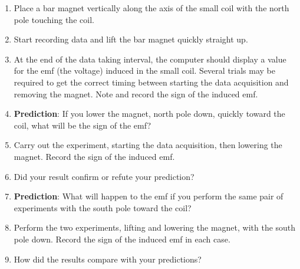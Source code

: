 \begin{enumerate}[resume*]


\item Place a bar magnet vertically along the axis of the small coil with
the north pole touching the coil.

\item Start recording data and lift the bar magnet quickly straight up.

\item At the end of the data taking interval, the computer should display
a value for the emf (the voltage) induced in the small coil.
Several trials may be required to get the correct timing between starting
the data acquisition and removing the magnet. Note and record the sign of the 
induced emf.
\answerspace{8mm}

\item \textbf{Prediction}: If you lower the magnet, north pole down, quickly
toward the coil, what will be the sign of the emf? 
\answerspace{8mm}

\item Carry out the experiment, starting the data acquisition, then lowering the magnet.
Record the sign of the induced emf.
\answerspace{8mm}

\item Did your result confirm or refute your prediction?
\answerspace{15mm}

\pagebreak[3]
\item \textbf{Prediction}: What will happen to the emf if you perform the
same pair of experiments with the south pole toward the coil? \vspace{10mm}

\item Perform the two experiments, lifting and lowering the magnet, with
the south pole down. Record the sign of the induced emf in each case.\vspace{10mm}

\item How did the results compare with your predictions?\vspace{10mm}

\end{enumerate}

